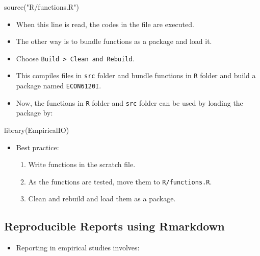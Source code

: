 \documentclass[
]{book}
\newenvironment{Shaded}{\begin{snugshade}}{\end{snugshade}}
\newcommand{\FunctionTok}[1]{\textcolor[rgb]{0.00,0.00,0.00}{#1}}
\newcommand{\NormalTok}[1]{#1}
\newcommand{\StringTok}[1]{\textcolor[rgb]{0.31,0.60,0.02}{#1}}
\providecommand{\tightlist}{%
  \setlength{\itemsep}{0pt}\setlength{\parskip}{0pt}}
\begin{document}
\begin{Shaded}
\begin{Highlighting}[]
\FunctionTok{source}\NormalTok{(}\StringTok{"R/functions.R"}\NormalTok{)}
\end{Highlighting}
\end{Shaded}

\begin{itemize}
\tightlist
\item
  When this line is read, the codes in the file are executed.
\item
  The other way is to bundle functions as a package and load it.
\item
  Choose \texttt{Build\ \textgreater{}\ Clean\ and\ Rebuild}.
\item
  This compiles files in \texttt{src} folder and bundle functions in \texttt{R} folder and build a package named \texttt{ECON6120I}.
\item
  Now, the functions in \texttt{R} folder and \texttt{src} folder can be used by loading the package by:
\end{itemize}

\begin{Shaded}
\begin{Highlighting}[]
\FunctionTok{library}\NormalTok{(EmpiricalIO)}
\end{Highlighting}
\end{Shaded}

\begin{itemize}
\tightlist
\item
  Best practice:

  \begin{enumerate}
  \def\labelenumi{\arabic{enumi}.}
  \tightlist
  \item
    Write functions in the scratch file.
  \item
    As the functions are tested, move them to \texttt{R/functions.R}.
  \item
    Clean and rebuild and load them as a package.
  \end{enumerate}
\end{itemize}

\hypertarget{reproducible-reports-using-rmarkdown}{%
\subsection{Reproducible Reports using Rmarkdown}\label{reproducible-reports-using-rmarkdown}}

\begin{itemize}
\tightlist
\item
  Reporting in empirical studies involves:
\end{itemize}
\end{document}
